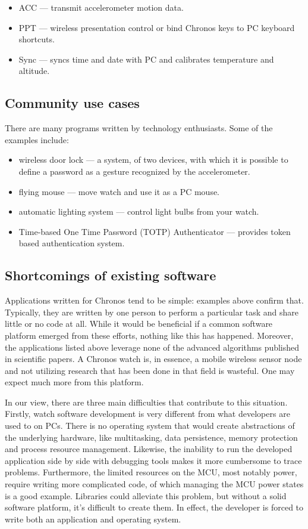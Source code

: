 \begin{itemize}
  \item ACC --- transmit accelerometer motion data.
  \item PPT --- wireless presentation control or bind Chronos
    keys to PC keyboard shortcuts.
  \item Sync --- syncs time and date with PC and calibrates
    temperature and altitude.
\end{itemize}

\subsection{Community use cases}
There are many programs written by technology enthusiasts. Some of the
examples include:

\begin{itemize}
  \item wireless door lock --- a system, of two devices, with which it
    is possible to define a password as a gesture recognized by the
    accelerometer.
  \item flying mouse --- move watch and use it as a PC mouse.
  \item automatic lighting system --- control light bulbs from your
    watch.
  \item Time-based One Time Password (TOTP) Authenticator --- provides
    token based authentication system.
\end{itemize}

\subsection{Shortcomings of existing software}

Applications written for Chronos tend to be simple: examples above
confirm that. Typically, they are written by one person to perform a
particular task and share little or no code at all.  While it would be
beneficial if a common software platform emerged from these efforts,
nothing like this has happened. Moreover, the applications listed
above leverage none of the advanced algorithms published in
scientific papers. A Chronos watch is, in essence, a mobile wireless
sensor node and not utilizing research that has been done in
that field is wasteful. One may expect much more from this platform.

In our view, there are three main difficulties that contribute to this
situation.  Firstly, watch software development is very different from
what developers are used to on PCs. There is no operating system
that would create abstractions of the underlying hardware, like
multitasking, data persistence, memory protection and process resource
management.  Likewise, the inability to run the developed application side by
side with debugging tools makes it more cumbersome to trace problems.
Furthermore, the limited resources on the MCU, most notably power, require writing more
complicated code, of which managing the MCU power states is a good example.
Libraries could alleviate this problem, but without a solid software
platform, it's difficult to create them. In effect, the developer is forced
to write both an application and operating system.

